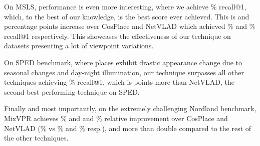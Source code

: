 \documentclass[10pt,twocolumn,letterpaper]{article}
\begin{document}
On MSLS, performance is even more interesting, where we achieve \% recall@1, which, to the best of our knowledge, is the best score ever achieved. This is  and  percentage points increase over CosPlace and NetVLAD which achieved \% and \% recall@1 respectively. This showcases the effectiveness of our technique on datasets presenting a lot of viewpoint variations.

On SPED benchmark, where places exhibit  drastic appearance change due to seasonal changes and day-night illumination, our technique surpasses all other techniques achieving \% recall@1, which is  points more than NetVLAD, the second best performing technique on SPED. 

Finally and most importantly, on the extremely challenging Nordland benchmark, MixVPR achieves \% and and \% relative improvement over CosPlace and NetVLAD (\% vs \% and \% resp.), and more than double compared to the rest of the other techniques.
\end{document}
